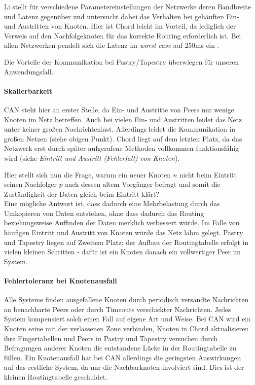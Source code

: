 Li stellt für verschiedene Parametereinstellungen der Netzwerke deren Bandbreite und Latenz gegenüber und untersucht dabei das Verhalten bei gehäuften Ein- und Austritten von Knoten. Hier ist Chord leicht im Vorteil, da lediglich der Verweis auf den Nachfolgeknoten für das korrekte Routing erforderlich ist. Bei allen Netzwerken pendelt sich die Latenz im \emph{worst case} auf 250ms ein \cite{Li2004Comparing}.

Die Vorteile der Kommunikation bei Pastry/Tapestry überwiegen für unseren Anwendungsfall.

\paragraph{Skalierbarkeit}
CAN steht hier an erster Stelle, da Ein- und Austritte von Peers nur wenige Knoten im Netz betreffen. Auch bei vielen Ein- und Austritten leidet das Netz unter keiner großen Nachrichtenlast. Allerdings leidet die Kommunikation in großen Netzen (siehe obigen Punkt). Chord liegt auf dem letzten Platz, da das Netzwerk erst durch später aufgerufene Methoden vollkommen funktionsfähig wird (siehe \emph{Eintritt und Austritt (Fehlerfall) von Knoten}).

Hier stellt sich nun die Frage, warum ein neuer Knoten $n$ nicht beim Eintritt seinen Nachfolger $p$ nach dessen altem Vorgänger befragt und somit die Zuständigkeit der Daten gleich beim Eintritt klärt?\\
Eine mögliche Antwort ist, dass dadurch eine Mehrbelastung durch das Umkopieren von Daten entstehen, ohne dass dadurch das Routing beziehungsweise Auffinden der Daten merklich verbessert würde. Im Falle von häufigen Eintritt und Austritt von Knoten würde das Netz lahm gelegt. Pastry und Tapestry liegen auf Zweitem Platz; der Aufbau der Routingtabelle erfolgt in vielen kleinen Schritten - dafür ist ein Knoten danach ein vollwertiger Peer im System.

\paragraph{Fehlertoleranz bei Knotenausfall}
Alle Systeme finden ausgefallene Knoten durch periodisch versandte Nachrichten an benachbarte Peers oder durch Timeouts verschickter Nachrichten. Jedes System kompensiert solch einen Fall auf eigene Art und Weise. Bei CAN wird ein Knoten seine mit der verlassenen Zone verbinden, Knoten in Chord aktualisieren ihre Fingertabellen und Peers in Pastry und Tapestry versuchen durch Befragungen anderer Knoten die entstandene Lücke in der Routingtabelle zu füllen. Ein Knotenausfall hat bei CAN allerdings die geringsten Auswirkungen auf das restliche System, da nur die Nachbarknoten involviert sind. Dies ist der kleinen Routingtabelle geschuldet.

